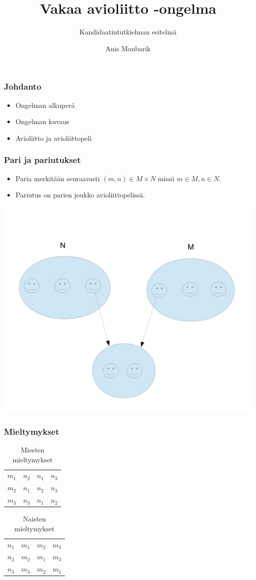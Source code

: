 \documentclass[table]{beamer}
\title{Vakaa avioliitto -ongelma}
\subtitle{Kandidaatintutkielman esitelmä}
\author{Anis Moubarik}
\date{}
\begin{document}
	\frame{\titlepage}
	\begin{frame}
		\frametitle{Johdanto}
		\fontsize{18pt}{7.2}\selectfont
		\begin{itemize}
			\item Ongelman alkuperä
			\item Ongelman kuvaus
			\item Avioliitto ja avioliittopeli
		\end{itemize}
	\end{frame}
	\begin{frame}
    \frametitle{Pari ja pariutukset}
    \fontsize{14pt}{7.2}\selectfont
    \begin{itemize}
		\item Paria merkitään seuraavasti $(m, n) \in M \times N$ missä $m \in M, n \in N$.
		\item  Pariutus on parien joukko avioliittopelissä.
    \end{itemize}
    \includegraphics[scale=0.42]{vakaa1}
  \end{frame}
  \begin{frame}
  	\frametitle{Mieltymykset}
  	\begin{table}[h!]
	\begin{tabular}{ l | *{2}{c} r }
	 &  \\
	 \hline
 	 $m_{1}$ & $n_{2}$ & $n_{1}$ & $n_{3}$ \\
 	 $m_{2}$ & $n_{1}$ & $n_{2}$ & $n_{3}$ \\
 	 $m_{3}$ & $n_{3}$ & $n_{1}$ & $n_{2}$ \\
	\end{tabular}
	\caption{Miesten mieltymykset}
	\end{table}
	\begin{table}[h!]
	\begin{tabular}{ l | *{2}{c} r }
	 &  \\
	 \hline
 	 $n_{1}$ & $m_{1}$ & $m_{2}$ & $m_{3}$ \\
 	 $n_{2}$ & $m_{2}$ & $m_{1}$ & $m_{3}$ \\
 	 $n_{3}$ & $m_{3}$ & $m_{2}$ & $m_{1}$ \\
	\end{tabular}
	\caption{Naisten mieltymykset}
	\end{table}
  \end{frame}
\end{document}
